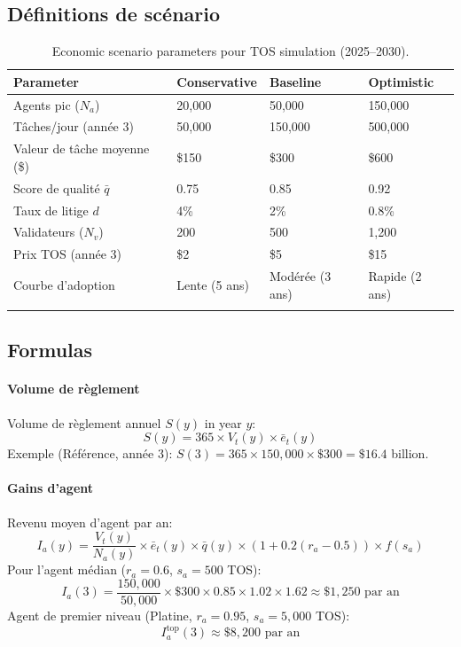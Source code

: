\documentclass[11pt]{article}
\begin{document}
\subsection{Définitions de scénario}
\begin{longtable}{@{}p{}p{}p{}p{}@{}}
\toprule
\textbf{Parameter} & \textbf{Conservative} & \textbf{Baseline} & \textbf{Optimistic} \\\midrule
Agents pic ($N_a$) & 20,000 & 50,000 & 150,000 \\
Tâches/jour (année 3) & 50,000 & 150,000 & 500,000 \\
Valeur de tâche moyenne (\$) & \$150 & \$300 & \$600 \\
Score de qualité $\bar{q}$ & 0.75 & 0.85 & 0.92 \\
Taux de litige $d$ & 4\% & 2\% & 0.8\% \\
Validateurs ($N_v$) & 200 & 500 & 1,200 \\
Prix TOS (année 3) & \$2 & \$5 & \$15 \\
Courbe d'adoption & Lente (5 ans) & Modérée (3 ans) & Rapide (2 ans) \\\bottomrule
\caption{Economic scenario parameters pour TOS simulation (2025--2030).}
\label{tab:econ-scenarios}
\end{longtable}

\subsection{Formulas}
\paragraph{Volume de règlement} Volume de règlement annuel $S(y)$ in year $y$:
\begin{equation}
S(y) = 365 \times V_t(y) \times \bar{e}_t(y)
\end{equation}
Exemple (Référence, année 3): $S(3) = 365 \times 150{,}000 \times \$300 = \$16.4$ billion.

\paragraph{Gains d'agent} Revenu moyen d'agent par an:
\begin{equation}
I_a(y) = \frac{V_t(y)}{N_a(y)} \times \bar{e}_t(y) \times \bar{q}(y) \times (1 + 0.2(r_a - 0.5)) \times f(s_a)
\end{equation}
Pour l'agent médian ($r_a = 0.6$, $s_a = 500$ TOS):
\begin{equation}
I_a(3) = \frac{150{,}000}{50{,}000} \times \$300 \times 0.85 \times 1.02 \times 1.62 \approx \$1{,}250 \text{ par an}
\end{equation}
Agent de premier niveau (Platine, $r_a = 0.95$, $s_a = 5{,}000$ TOS):
\begin{equation}
I_a^{\text{top}}(3) \approx \$8{,}200 \text{ par an}
\end{equation}
\end{document}
